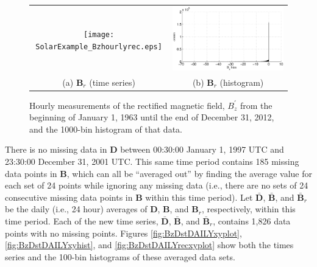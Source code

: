 \documentclass{article}[10pt]
\begin{document}
\begin{figure}[ht]
\begin{tabular}{cc}
\texttt{[image: SolarExample\_Bzhourlyrec.eps]} & \includegraphics[scale=0.51]{SolarExample_Bzhourlyrechist.eps} \\
(a) $\mathbf{B}_r$ (time series) & (b) $\mathbf{B}_r$ (histogram)
\end{tabular}
\caption{Hourly measurements of the rectified magnetic field, $B_z^\prime$ from the beginning of January 1, 1963 until the end of December 31, 2012, and the 1000-bin histogram of that data.}
\label{fig:BzDstHOURLYrecxyplot}
\end{figure}

There is no missing data in $\mathbf{D}$ between 00:30:00 January 1, 1997 UTC and 23:30:00 December 31, 2001 UTC.  This same time period contains 185 missing data points in $\mathbf{B}$, which can all be ``averaged out'' by finding the average value for each set of 24 points while ignoring any missing data (i.e., there are no sets of 24 consecutive missing data points in $\mathbf{B}$ within this time period).  Let $\bar{\mathbf{D}}$, $\bar{\mathbf{B}}$, and $\bar{\mathbf{B}}_r$ be the daily (i.e., 24 hour) averages of $\mathbf{D}$, $\mathbf{B}$, and $\mathbf{B}_r$, respectively, within this time period.  Each of the new time series, $\bar{\mathbf{D}}$, $\bar{\mathbf{B}}$, and $\bar{\mathbf{B}}_r$, contains 1,826 data points with no missing points.  Figures \ref{fig:BzDstDAILYxyplot}, \ref{fig:BzDstDAILYxyhist}, and \ref{fig:BzDstDAILYrecxyplot} show both the times series and the 100-bin histograms of these averaged data sets.  
\end{document}
